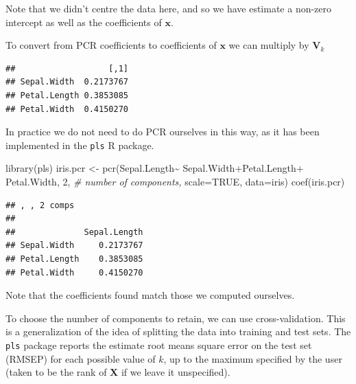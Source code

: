 \documentclass[
]{book}
\newenvironment{Shaded}{\begin{snugshade}}{\end{snugshade}}
\newcommand{\AttributeTok}[1]{\textcolor[rgb]{0.77,0.63,0.00}{#1}}
\newcommand{\CommentTok}[1]{\textcolor[rgb]{0.56,0.35,0.01}{\textit{#1}}}
\newcommand{\ConstantTok}[1]{\textcolor[rgb]{0.00,0.00,0.00}{#1}}
\newcommand{\DecValTok}[1]{\textcolor[rgb]{0.00,0.00,0.81}{#1}}
\newcommand{\FunctionTok}[1]{\textcolor[rgb]{0.00,0.00,0.00}{#1}}
\newcommand{\NormalTok}[1]{#1}
\newcommand{\OtherTok}[1]{\textcolor[rgb]{0.56,0.35,0.01}{#1}}
\newcommand{\SpecialCharTok}[1]{\textcolor[rgb]{0.00,0.00,0.00}{#1}}
\theoremstyle{definition}
\theoremstyle{definition}
\theoremstyle{definition}
\theoremstyle{definition}
\theoremstyle{remark}
\begin{document}
Note that we didn't centre the data here, and so we have estimate a non-zero intercept as well as the coefficients of \(\mathbf x\).

To convert from PCR coefficients to coefficients of \(\mathbf x\) we can multiply by \(\mathbf V_k\)

\begin{Shaded}
\end{Shaded}

\begin{verbatim}
##                   [,1]
## Sepal.Width  0.2173767
## Petal.Length 0.3853085
## Petal.Width  0.4150270
\end{verbatim}

In practice we do not need to do PCR ourselves in this way, as it has been implemented in the \texttt{pls} R package.

\begin{Shaded}
\begin{Highlighting}[]
\FunctionTok{library}\NormalTok{(pls)}
\NormalTok{iris.pcr }\OtherTok{\textless{}{-}} \FunctionTok{pcr}\NormalTok{(Sepal.Length}\SpecialCharTok{\textasciitilde{}}\NormalTok{ Sepal.Width}\SpecialCharTok{+}\NormalTok{Petal.Length}\SpecialCharTok{+}
\NormalTok{                  Petal.Width, }\DecValTok{2}\NormalTok{, }\CommentTok{\# number of components,}
                \AttributeTok{scale=}\ConstantTok{TRUE}\NormalTok{, }\AttributeTok{data=}\NormalTok{iris)}
\FunctionTok{coef}\NormalTok{(iris.pcr)}
\end{Highlighting}
\end{Shaded}

\begin{verbatim}
## , , 2 comps
## 
##              Sepal.Length
## Sepal.Width     0.2173767
## Petal.Length    0.3853085
## Petal.Width     0.4150270
\end{verbatim}

Note that the coefficients found match those we computed ourselves.

To choose the number of components to retain, we can use cross-validation. This is a generalization of the idea of splitting the data into training and test sets. The \texttt{pls} package reports the estimate root means square error on the test set (RMSEP) for each possible value of \(k\), up to the maximum specified by the user (taken to be the rank of \(\mathbf X\) if we leave it unspecified).
\end{document}
